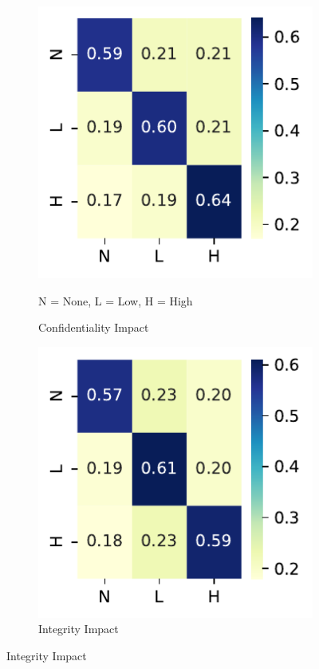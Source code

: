 \documentclass[12pt]{article}
\begin{document}
\begin{figure}
\begin{subfigure}[b]{0.45\textwidth}
		\includegraphics[width=\textwidth]{./figures/confusion_matrices/confidentiality_impact_mitre.pdf}
		\caption{Confidentiality Impact}
		\begin{tablenotes}
			\footnotesize
			\item \quad N = None, L = Low, H = High
		\end{tablenotes}
	\end{subfigure}

	\vspace{1em}

	\begin{subfigure}[b]{0.45\textwidth}
		\includegraphics[width=\textwidth]{./figures/confusion_matrices/integrity_impact_mitre.pdf}
		\caption{Integrity Impact}


\end{subfigure}
\end{figure}
\end{document}
